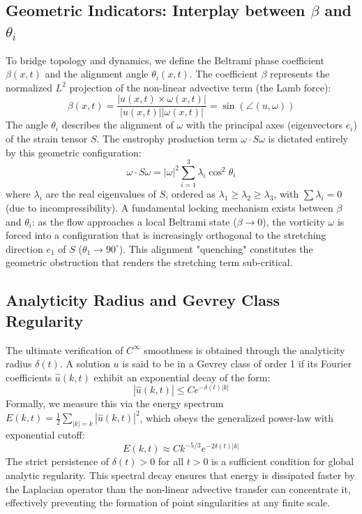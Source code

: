 \documentclass[12pt,a4paper]{article}
\theoremstyle{plain}
\theoremstyle{definition}
\theoremstyle{remark}
\begin{document}
\subsection{Geometric Indicators: Interplay between \texorpdfstring{$\beta$}{beta} and \texorpdfstring{$\theta_i$}{theta\_i}}
To bridge topology and dynamics, we define the Beltrami phase coefficient $\beta(x,t)$ and the alignment angle $\theta_i(x,t)$. The coefficient $\beta$ represents the normalized $L^2$ projection of the non-linear advective term (the Lamb force):
\begin{equation}
    \beta(x,t) = \frac{|u(x,t) \times \omega(x,t)|}{|u(x,t)||\omega(x,t)|} = \sin(\angle(u, \omega))
\end{equation}
The angle $\theta_i$ describes the alignment of $\omega$ with the principal axes (eigenvectors $e_i$) of the strain tensor $S$. The enstrophy production term $\omega \cdot S \omega$ is dictated entirely by this geometric configuration:
\begin{equation}
    \omega \cdot S \omega = |\omega|^2 \sum_{i=1}^3 \lambda_i \cos^2 \theta_i
\end{equation}
where $\lambda_i$ are the real eigenvalues of $S$, ordered as $\lambda_1 \geq \lambda_2 \geq \lambda_3$, with $\sum \lambda_i = 0$ (due to incompressibility). A fundamental locking mechanism exists between $\beta$ and $\theta_i$: as the flow approaches a local Beltrami state ($\beta \to 0$), the vorticity $\omega$ is forced into a configuration that is increasingly orthogonal to the stretching direction $e_1$ of $S$ ($\theta_1 \to 90^\circ$). This alignment "quenching" constitutes the geometric obstruction that renders the stretching term sub-critical.

\subsection{Analyticity Radius and Gevrey Class Regularity}
The ultimate verification of $C^\infty$ smoothness is obtained through the analyticity radius $\delta(t)$. A solution $u$ is said to be in a Gevrey class of order 1 \cite{gevrey1918, foias1989} if its Fourier coefficients $\hat{u}(k,t)$ exhibit an exponential decay of the form:
\begin{equation}
    |\hat{u}(k,t)| \leq C e^{-\delta(t)|k|}
\end{equation}
Formally, we measure this via the energy spectrum $E(k,t) = \frac{1}{2} \sum_{|k|=k} |\hat{u}(k,t)|^2$, which obeys the generalized power-law with exponential cutoff:
\begin{equation}
    E(k,t) \approx C k^{-5/3} e^{-2\delta(t) |k|}
\end{equation}
The strict persistence of $\delta(t) > 0$ for all $t > 0$ is a sufficient condition for global analytic regularity. This spectral decay ensures that energy is dissipated faster by the Laplacian operator than the non-linear advective transfer can concentrate it, effectively preventing the formation of point singularities at any finite scale.
\end{document}
